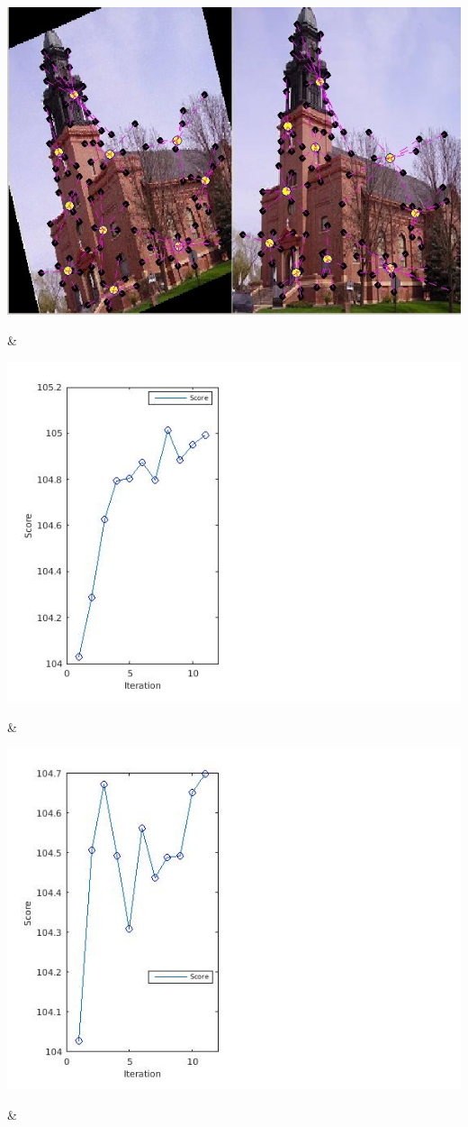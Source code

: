 \documentclass[
	fontsize=12pt,
	paper=a4,
	twoside=false,
	numbers=noenddot,
	plainheadsepline,
	toc=listof,
	toc=bibliography
]{scrartcl}
\begin{document}
\begin{landscape}
\begin{table}
\begin{tabular}
		\hline

		\rule{0pt}{5cm}
		\parbox[t]{1em}{
			\includegraphics[scale = 0.2]{fig/initial_graphs2.jpg}}  & 
		\parbox[b]{1em}{
			\includegraphics[scale = 0.28]{fig/method1/test2/accuracy_HL.jpg}}  & 
		\parbox[b]{1em}{
			\includegraphics[scale = 0.28]{fig/method2/test2/accuracy_HL.jpg}}  &

\end{tabular}
\end{table}
\end{landscape}
\end{document}
